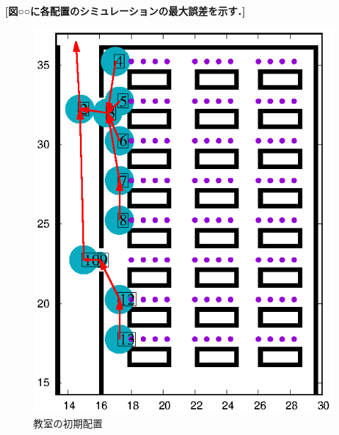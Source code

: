 \textbf{
[図○○に各配置のシミュレーションの最大誤差を示す．]
}
\fi

\clearpage

\begin{figure}[tb]
	\begin{minipage}[b]{0.5\columnwidth}
		\centering
		\includegraphics[width=\columnwidth]{figure/kyositu_v2.eps}
		\caption{教室の初期配置}
    \label{fig:kyositu_haichi}
	\end{minipage}
	\begin{minipage}[b]{0.5\columnwidth}
		\centering

\end{minipage}
\end{figure}
